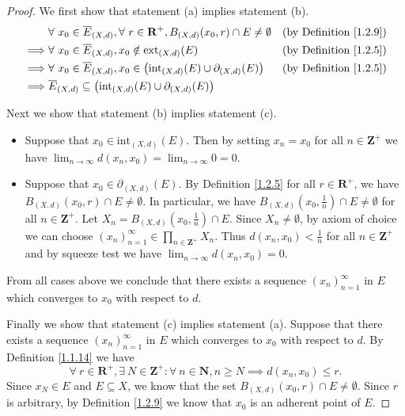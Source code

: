 \begin{proof}
    We first show that statement (a) implies statement (b).
    \begin{align*}
                 & \forall\ x_0 \in \overline{E}_{(X, d)}, \forall\ r \in \mathbf{R}^+, B_{(X, d)}(x_0, r) \cap E \neq \emptyset & \text{(by Definition \ref{1.2.9})} \\
        \implies & \forall\ x_0 \in \overline{E}_{(X, d)}, x_0 \notin \text{ext}_{(X, d)}(E)                                     & \text{(by Definition \ref{1.2.5})} \\
        \implies & \forall\ x_0 \in \overline{E}_{(X, d)}, x_0 \in \big(\text{int}_{(X, d)}(E) \cup \partial_{(X, d)}(E)\big)    & \text{(by Definition \ref{1.2.5})} \\
        \implies & \overline{E}_{(X, d)} \subseteq \big(\text{int}_{(X, d)}(E) \cup \partial_{(X, d)}(E)\big)
    \end{align*}

    Next we show that statement (b) implies statement (c).
    \begin{itemize}
        \item Suppose that \(x_0 \in \text{int}_{(X, d)}(E)\).
              Then by setting \(x_n = x_0\) for all \(n \in \mathbf{Z}^+\) we have \(\lim_{n \to \infty} d(x_n, x_0) = \lim_{n \to \infty} 0 = 0\).
        \item Suppose that \(x_0 \in \partial_{(X, d)}(E)\).
              By Definition \ref{1.2.5} for all \(r \in \mathbf{R}^+\), we have \(B_{(X, d)}(x_0, r) \cap E \neq \emptyset\).
              In particular, we have \(B_{(X, d)}(x_0, \frac{1}{n}) \cap E \neq \emptyset\) for all \(n \in \mathbf{Z}^+\).
              Let \(X_n = B_{(X, d)}(x_0, \frac{1}{n}) \cap E\).
              Since \(X_n \neq \emptyset\), by axiom of choice we can choose \((x_n)_{n = 1}^\infty \in \prod_{n \in \mathbf{Z}^+} X_n\).
              Thus \(d(x_n, x_0) < \frac{1}{n}\) for all \(n \in \mathbf{Z}^+\) and by squeeze test we have \(\lim_{n \to \infty} d(x_n, x_0) = 0\).
    \end{itemize}
    From all cases above we conclude that there exists a sequence \((x_n)_{n = 1}^\infty\) in \(E\) which converges to \(x_0\) with respect to \(d\).

    Finally we show that statement (c) implies statement (a).
    Suppose that there exists a sequence \((x_n)_{n = 1}^\infty\) in \(E\) which converges to \(x_0\) with respect to \(d\).
    By Definition \ref{1.1.14} we have
    \[
        \forall\ r \in \mathbf{R}^+, \exists\ N \in \mathbf{Z}^+ : \forall\ n \in \mathbf{N}, n \geq N \implies d(x_n, x_0) \leq r.
    \]
    Since \(x_N \in E\) and \(E \subseteq X\), we know that the set \(B_{(X, d)}(x_0, r) \cap E \neq \emptyset\).
    Since \(r\) is arbitrary, by Definition \ref{1.2.9} we know that \(x_0\) is an adherent point of \(E\).
\end{proof}

